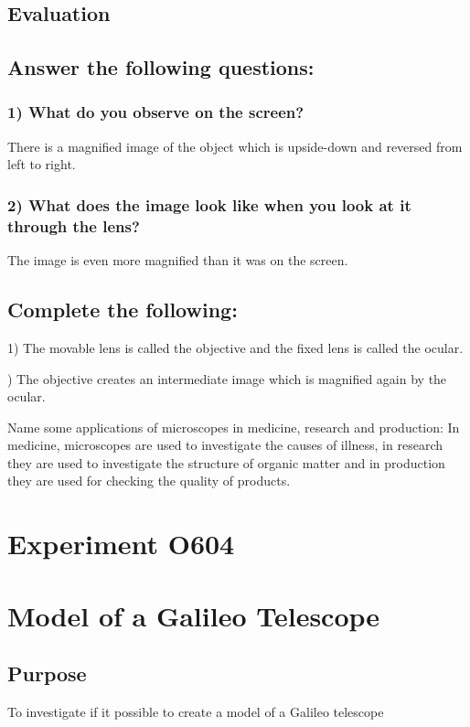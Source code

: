 \documentclass[12pt]{article}
\begin{document}
\subsection*{Evaluation}


\subsection*{Answer the following questions:}

\subsubsection*{1) What do you observe on the screen?}

There is a magnified image of the object which is upside-down and reversed from left to
right.

\subsubsection*{2) What does the image look like when you look at it through the lens?}

The image is even more magnified than it was on the screen.

\subsection*{Complete the following:}

1) The movable lens is called the objective and the fixed lens is called the ocular.

) The objective creates an intermediate image which is magnified again by the ocular.

Name some applications of microscopes in medicine, research and production:
In medicine, microscopes are used to investigate the causes of illness, in research they are used to investigate the structure of organic matter and in production they are used for checking the quality of products.

\newpage
\section*{Experiment O604}

\section*{Model of a Galileo Telescope}

\subsection*{Purpose}
To investigate if it possible to create a model of a Galileo telescope
\end{document}
